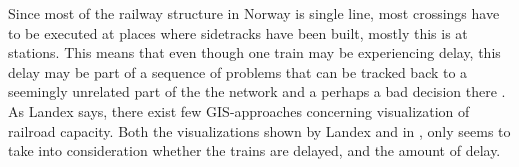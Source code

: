 Since most of the railway structure in Norway is single line, most crossings
have to be executed at places where sidetracks have been built, mostly this is
at stations. This means that even though one train may be experiencing delay, 
this delay may be part of a sequence of problems that can be tracked back to a 
seemingly unrelated part of the the network and a perhaps a bad decision there 
\cite{cule2011mining}.
\\

As Landex\cite{landex2009gis} says, there exist few GIS-approaches concerning
visualization of railroad capacity. Both the visualizations shown by Landex and
in  , 
only seems to take into consideration whether
the trains are delayed, and the amount of delay. \\

